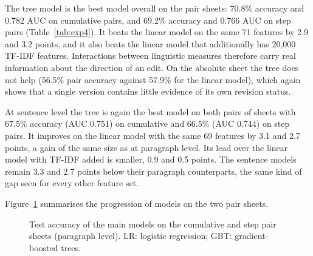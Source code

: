 \documentclass[12pt,a4paper,oneside]{report}
\begin{document}
The tree model is the best model overall on the pair sheets: 70.8\% accuracy and 0.782 AUC on cumulative pairs, and 69.2\% accuracy and 0.766 AUC on step pairs (Table~\ref{tab:exp4}). It beats the linear model on the same 71 features by 2.9 and 3.2 points, and it also beats the linear model that additionally has 20{,}000 TF-IDF features. Interactions between linguistic measures therefore carry real information about the direction of an edit. On the absolute sheet the tree does not help (56.5\% pair accuracy against 57.9\% for the linear model), which again shows that a single version contains little evidence of its own revision status.

At sentence level the tree is again the best model on both pairs of sheets with 67.5\% accuracy (AUC 0.751) on cumulative and 66.5\% (AUC 0.744) on step pairs. It improves on the linear model with the same 69 features by 3.1 and 2.7 points, a gain of the same size as at paragraph level. Its lead over the linear model with TF-IDF added is smaller, 0.9 and 0.5 points. The sentence models remain 3.3 and 2.7 points below their paragraph counterparts, the same kind of gap seen for every other feature set.

Figure~\ref{fig:summary} summarises the progression of models on the two pair sheets.

\begin{figure}[ht]
\centering
{}
\caption[Accuracy of the main models on pair sheets]{Test accuracy of the main models on the cumulative and step pair sheets (paragraph level). LR: logistic regression; GBT: gradient-boosted trees.}
\label{fig:summary}
\end{figure}
\end{document}
